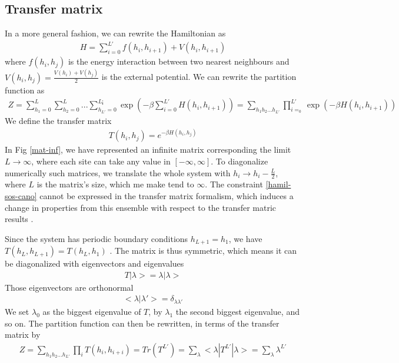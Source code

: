 \subsection{Transfer matrix}


In a more general fashion, we can rewrite the Hamiltonian as
\begin{align*}
H = \sum_{i=0}^{L'} f(h_i,h_{i+1}) + V(h_i,h_{i+1}) 
\end{align*}
where $f(h_i,h_j)$ is the energy interaction between two nearest neighbours and $V(h_i,h_j)=\frac{V(h_i)+V(h_j)}{2}$ is the external potential. We can rewrite the partition function as 
\begin{align}
Z = \sum_{h_1=0}^{L} \sum_{h_2=0}^{L}... \sum_{h_{L'}=0}^{L¡} \exp(- \beta \sum_{i=0}^{L'} H(h_i,h_{i+1}))
= \sum_{h_1 h_2 ... h_{L'}} \prod_{i=_0}^{L'} \exp(-\beta H(h_i,h_{i+1}))
\end{align}
We define the transfer matrix
\begin{align}
T(h_i,h_j) = e^{-\beta H(h_i,h_j)}
\label{matric-transfert}
\end{align}
In Fig \ref{mat-inf}, we have represented an infinite matrix corresponding the limit $L\to \infty$, where each site can take any value in $[-\infty,\infty]$. To diagonalize numerically such matrices, we translate the whole system with $h_i \to h_i - \frac{L}{2}$, where $L$ is the matrix's size, which me make tend to $\infty$.
The constraint \eqref{hamil-sos-cano} cannot be expressed in the transfer matrix formalism, which induces a change in properties from this ensemble with respect to the transfer matric results \cite{siegert_scaling_1993}.

Since the system has periodic boundary conditions $h_{L+1} = h_1$, we have $T(h_L,h_{L+1}) = T(h_L,h_1)$ \cite{pearce_exact_1989}. The matrix is thus symmetric, which means it can be diagonalized with eigenvectors and eigenvalues 
\begin{align}
T | \lambda> = \lambda |\lambda>
\end{align}
Those eigenvectors are orthonormal
\begin{align}
< \lambda | \lambda'> = \delta_{\lambda \lambda'}
\end{align}
We set $\lambda_0$ as the biggest eigenvalue of $T$, by $\lambda_1$ the second biggest eigenvalue, and so on. The partition function can then be rewritten, in terms of the transfer matrix \cite{abraham_transfer_1973} by
\begin{align}
Z = \sum_{h_1 h_2 ... h_{L'}} \prod_{i} T(h_i,h_{i+i}) = Tr( T^{L'}) = \sum_\lambda <\lambda | T^{L'} | \lambda> = \sum_\lambda \lambda^{L'}
\label{partition-trace-lambda}
\end{align}

